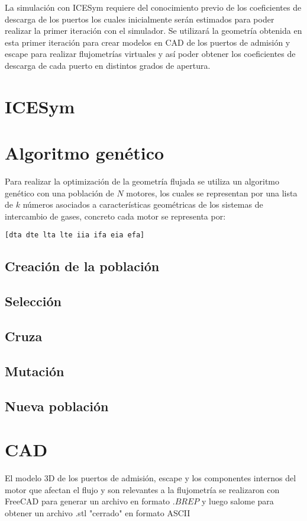 La simulación con ICESym requiere del conocimiento previo de los coeficientes
de descarga de los puertos los cuales inicialmente serán estimados para poder
realizar la primer iteración con el simulador.
%
Se utilizará la geometría obtenida en esta primer iteración para crear modelos
en CAD de los puertos de admisión y escape para realizar flujometrías virtuales
y así poder obtener los coeficientes de descarga de cada puerto en distintos
grados de apertura.


\section{ICESym}



\section{Algoritmo genético}

Para realizar la optimización de la geometría flujada se utiliza un algoritmo
genético con una población de $N$ motores, los cuales se representan por una
lista de $k$ números asociados a características geométricas de los sistemas de
intercambio de gases, concreto cada motor se representa por:

\begin{verbatim}
[dta dte lta lte iia ifa eia efa]
\end{verbatim}


\subsection{Creación de la población}
\subsection{Selección}
\subsection{Cruza}
\subsection{Mutación}
\subsection{Nueva población}

\section{CAD}
El modelo 3D de los puertos de admisión, escape y los componentes internos del
motor que afectan el flujo y son relevantes a la flujometría se realizaron con
FreeCAD\cite{freecad} para generar un archivo en formato $.BREP$ y luego
salome\cite{salome} para obtener un archivo .stl "cerrado" en formato ASCII

